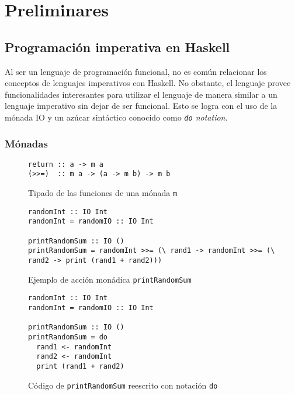 \chapter{Preliminares}\label{chap:prelims}

\section{Programación imperativa en Haskell}

Al ser un lenguaje de programación funcional, no es común relacionar los conceptos de lenguajes imperativos con Haskell. No obstante, el lenguaje provee funcionalidades interesantes para utilizar el lenguaje de manera similar a un lenguaje imperativo sin dejar de ser funcional.
Esto se logra con el uso de la mónada IO y un azúcar sintáctico conocido como \emph{\texttt{do} notation}\cite{do-notation}.

\subsection{Mónadas}

\begin{figure}[t]
  \centering
\begin{verbatim}
return :: a -> m a
(>>=)  :: m a -> (a -> m b) -> m b
\end{verbatim}
  \caption{Tipado de las funciones de una mónada \texttt{m}}
  \label{fig:io-functions}
\end{figure}

\begin{figure}[t]
  \centering
\begin{verbatim}
randomInt :: IO Int
randomInt = randomIO :: IO Int

printRandomSum :: IO ()
printRandomSum = randomInt >>= (\ rand1 -> randomInt >>= (\ rand2 -> print (rand1 + rand2)))
\end{verbatim}
  \caption{Ejemplo de acción monádica \texttt{printRandomSum}}
  \label{fig:functional-randomSum}
\end{figure}

\begin{figure}[t]
  \centering
\begin{verbatim}
randomInt :: IO Int
randomInt = randomIO :: IO Int

printRandomSum :: IO ()
printRandomSum = do
  rand1 <- randomInt
  rand2 <- randomInt
  print (rand1 + rand2)
\end{verbatim}
  \caption{Código de \texttt{printRandomSum} reescrito con notación \texttt{do}}
  \label{fig:do-randomSum}
\end{figure}

